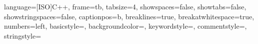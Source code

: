 \usepackage{amsmath}
\usepackage{amsfonts}
\usepackage{amsthm}
\usepackage{amssymb}
\usepackage{mathtools}
\usepackage{bm}
\newcommand{\uvec}[1]{\boldsymbol{\hat{\textbf{#1}}}}

\DeclarePairedDelimiter{\ceil}{\lceil}{\rceil}
\DeclarePairedDelimiter{\floor}{\lfloor}{\rfloor}
\DeclarePairedDelimiter{\bag}{\langle}{\rangle}
\DeclarePairedDelimiter{\set}{\{}{\}}

\usepackage{marginnote}
\usepackage[shortlabels]{enumitem}

\usepackage{lastpage}
\usepackage{fancyhdr}
\setlength{\headheight}{24pt}
\usepackage{eurosym}
\pagestyle{fancy}

\usepackage[nameinlink]{cleveref}

\title{\doctitle}
\author{\docauthor}
\date{\today}

\lhead{\doctitleshort}
\rhead{\today}
\cfoot{\thepage\ /~\pageref{LastPage}}


\usepackage{changepage}



 {
    language=[ISO]C++,
    frame=tb,
    tabsize=4,
    showspaces=false,
    showtabs=false,
    showstringspaces=false,
    captionpos=b,
    breaklines=true,
    breakatwhitespace=true,
    numbers=left,
    basicstyle=\scriptsize\ttfamily,
    backgroundcolor=\color{back-color},
    keywordstyle=\color{keywords},
    commentstyle=\color{comments},
    stringstyle=\color{strings}
}
\lstset{style=c++}


\doctitlepage{}

\tableofcontents
\thispagestyle{empty}
\newpage

\clearpage
\setcounter{page}{1}
\newpage


\newpage



\newpage

